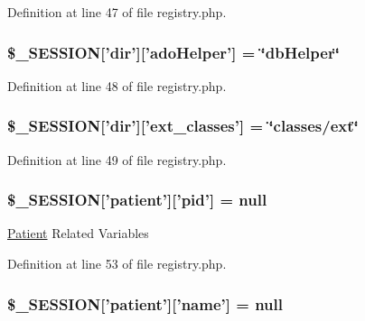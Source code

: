 \-Definition at line 47 of file registry.\-php.

\hypertarget{registry_8php_a4ef44640a35338f25c4ed6b2d6564b00}{
\subsubsection[{\$\-\_\-\-S\-E\-S\-S\-I\-O\-N}]{\setlength{\rightskip}{0pt plus 5cm}\$\-\_\-\-S\-E\-S\-S\-I\-O\-N\mbox{[}'dir'\mbox{]}\mbox{[}'ado\-Helper'\mbox{]} = \char`\"{}db\-Helper\char`\"{}}}\label{registry_8php_a4ef44640a35338f25c4ed6b2d6564b00}


\-Definition at line 48 of file registry.\-php.

\hypertarget{registry_8php_a266e038ef50352013493970ed65dae0b}{
\subsubsection[{\$\-\_\-\-S\-E\-S\-S\-I\-O\-N}]{\setlength{\rightskip}{0pt plus 5cm}\$\-\_\-\-S\-E\-S\-S\-I\-O\-N\mbox{[}'dir'\mbox{]}\mbox{[}'ext\-\_\-classes'\mbox{]} = \char`\"{}classes/ext\char`\"{}}}\label{registry_8php_a266e038ef50352013493970ed65dae0b}


\-Definition at line 49 of file registry.\-php.

\hypertarget{registry_8php_a9fd347ae0bcd272e5a1ebefef4a9f4ca}{
\subsubsection[{\$\-\_\-\-S\-E\-S\-S\-I\-O\-N}]{\setlength{\rightskip}{0pt plus 5cm}\$\-\_\-\-S\-E\-S\-S\-I\-O\-N\mbox{[}'patient'\mbox{]}\mbox{[}'pid'\mbox{]} = null}}\label{registry_8php_a9fd347ae0bcd272e5a1ebefef4a9f4ca}
\hyperlink{class_patient}{\-Patient} \-Related \-Variables 

\-Definition at line 53 of file registry.\-php.

\hypertarget{registry_8php_ac75ed6cc6c02a1138612fe71c56a98f3}{
\subsubsection[{\$\-\_\-\-S\-E\-S\-S\-I\-O\-N}]{\setlength{\rightskip}{0pt plus 5cm}\$\-\_\-\-S\-E\-S\-S\-I\-O\-N\mbox{[}'patient'\mbox{]}\mbox{[}'name'\mbox{]} = null}}\label{registry_8php_ac75ed6cc6c02a1138612fe71c56a98f3}


